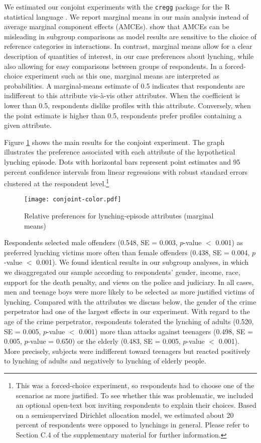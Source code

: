 \documentclass[12pt,ansiapaper]{article}
\begin{document}
We estimated our conjoint experiments with the \texttt{cregg} package \citep{leeper2018cregg} for the R statistical language \citep{rstats2019}. We report marginal means in our main analysis instead of average marginal component effects (AMCEs). \citet{leeper2018subgroup} show that AMCEs can be misleading in subgroup comparisons as model results are sensitive to the choice of reference categories in interactions. In contrast, marginal means allow for a clear description of quantities of interest, in our case preferences about lynching, while also allowing for easy comparisons between groups of respondents. In a forced-choice experiment such as this one, marginal means are interpreted as probabilities. A marginal-means estimate of 0.5 indicates that respondents are indifferent to this attribute vis-à-vis other attributes. When the coefficient is lower than 0.5, respondents dislike profiles with this attribute. Conversely, when the point estimate is higher than 0.5, respondents prefer profiles containing a given attribute.

Figure \ref{fig:exp01} shows the main results for the conjoint experiment. The graph illustrates the preference associated with each attribute of the hypothetical lynching episode. Dots with horizontal bars represent point estimates and 95 percent confidence intervals from linear regressions with robust standard errors clustered at the respondent level.\footnote{This was a forced-choice experiment, so respondents had to choose one of the scenarios as more justified. To see whether this was problematic, we included an optional open-text box inviting respondents to explain their choices. Based on a semisupervized Dirichlet allocation model, we estimated about 20 percent of respondents were opposed to lynchings in general. Please refer to Section C.4 of the supplementary material for further information.}

\begin{figure}[ht]
\texttt{[image: conjoint-color.pdf]}
\caption{Relative preferences for lynching-episode attributes (marginal means)}
\centering
\label{fig:exp01}
\end{figure}

Respondents selected male offenders (0.548, SE = 0.003, $p$-value $<$ 0.001) as preferred lynching victims more often than female offenders (0.438, SE = 0.004, $p$-value $<$ 0.001). We found identical results in our subgroup analyses, in which we disaggregated our sample according to respondents' gender, income, race, support for the death penalty, and views on the police and judiciary. In all cases, men and teenage boys were more likely to be selected as more justified victims of lynching. Compared with the attributes we discuss below, the gender of the crime perpetrator had one of the largest effects in our experiment. With regard to the age of the crime perpetrator, respondents tolerated the lynching of adults (0.520, SE = 0.005, $p$-value $<$ 0.001) more than attacks against teenagers (0.498, SE = 0.005, $p$-value = 0.650) or the elderly (0.483, SE = 0.005, $p$-value $<$ 0.001). More precisely, subjects were indifferent toward teenagers but reacted positively to lynching of adults and negatively to lynching of elderly people.
\end{document}
